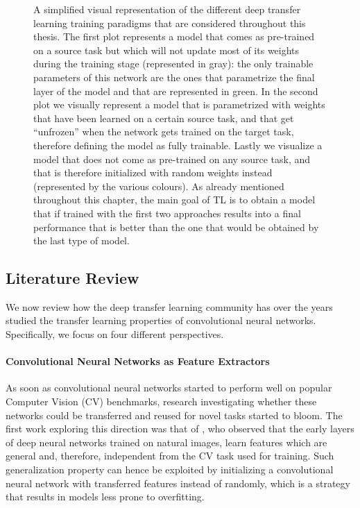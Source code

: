 \begin{figure}[!htb]
\endminipage
\caption{A simplified visual representation of the different deep transfer learning training paradigms that are considered throughout this thesis. The first plot represents a model that comes as pre-trained on a source task but which will not update most of its weights during the training stage (represented in gray): the only trainable parameters of this network are the ones that parametrize the final layer of the model and that are represented in green. In the second plot we visually represent a model that is parametrized with weights that have been learned on a certain source task, and that get ``unfrozen'' when the network gets trained on the target task, therefore defining the model as fully trainable. Lastly we visualize a model that does not come as pre-trained on any source task, and that is therefore initialized with random weights instead (represented by the various colours). As already mentioned throughout this chapter, the main goal of TL is to obtain a model that if trained with the first two approaches results into a final performance that is better than the one that would be obtained by the last type of model.}
\label{fig:network_training_approaches}
\end{figure}


\subsection{Literature Review}
\label{sec:literature_review_ch03}

We now review how the deep transfer learning community has over the years studied the transfer learning properties of convolutional neural networks. Specifically, we focus on four different perspectives.

\paragraph{\textbf{\uppercase{C}onvolutional \uppercase{N}eural \uppercase{N}etworks as \uppercase{F}eature \uppercase{E}xtractors}}
As soon as convolutional neural networks started to perform well on popular Computer Vision (CV) benchmarks, research investigating whether these networks could be transferred and reused for novel tasks started to bloom. The first work exploring this direction was that of \citet{yosinski2014transferable}, who observed that the early layers of deep neural networks trained on natural images, learn features which are general and, therefore, independent from the CV task used for training. Such generalization property can hence be exploited by initializing a convolutional neural network with transferred features instead of randomly, which is a strategy that results in models less prone to overfitting. 


